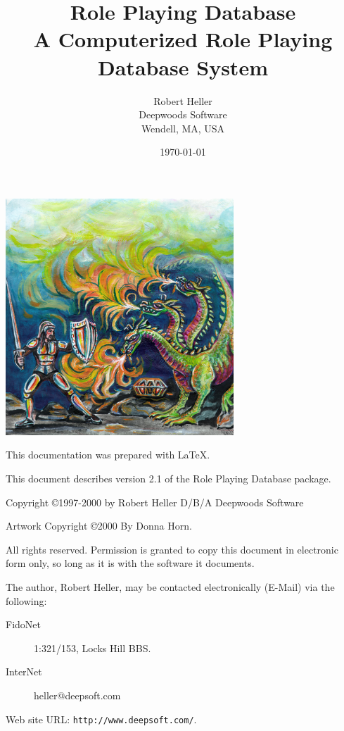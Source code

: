 \title{Role Playing Database \\ A Computerized Role Playing Database System \\ \RPGSubTitle}
\author{Robert Heller \\ Deepwoods Software \\ Wendell, MA, USA}
\date{\today}
\begin{titlepage}

\maketitle

\begin{centering}
\includegraphics[height=3.5in]{Cover1.png} \\
\end{centering}

\clearpage


This documentation was prepared with \LaTeX.

This document describes version 2.1 of the Role Playing Database package.

\vspace{.25in}



{\small Copyright \copyright 1997-2000 by Robert Heller D/B/A Deepwoods
Software}

{\small Artwork Copyright \copyright 2000 By Donna Horn.}

\vspace{.25in}

All rights reserved.  Permission is granted to copy this document in
electronic form only, so long as it is with the software it
documents. 

The author, Robert Heller, may be contacted electronically (E-Mail) via
the following:

\begin{description}
\item[FidoNet] 1:321/153, Locks Hill BBS.
\item[InterNet] heller@deepsoft.com
\end{description}

Web site URL: {\tt http://www.deepsoft.com/}.

\thispagestyle{empty}
\setcounter{page}{0}
\clearpage

\end{titlepage}

